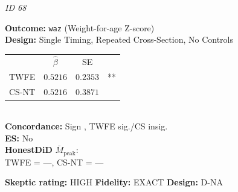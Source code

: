 \begin{tcolorbox}[
  colback=white, colframe=black!60, boxrule=0.4pt,
  arc=2pt, left=4pt, right=4pt, top=3pt, bottom=3pt]
  \footnotesize
  \textbf{\textcite{tanaka2014abolishing}} \hfill \textit{ID 68}\\[2pt]
  
  \begin{minipage}[t]{0.45\textwidth}
    \textbf{Outcome:} \texttt{waz} (Weight-for-age Z-score)\\
    \textbf{Design:} Single Timing, Repeated Cross-Section, No Controls\\
  \end{minipage}\hfill
  \begin{minipage}[t]{0.45\textwidth}
    \begin{tabular}{@{}lccc@{}}
      & $\hat{\beta}$ & SE & \\
      TWFE & $0.5216$ & $0.2353$ & ** \\
      CS-NT & $0.5216$ & $0.3871$ &  \\
    \end{tabular}\\[3pt]
    \textbf{Concordance:} Sign \checkmark, TWFE sig./CS insig.\\
    \textbf{ES:} No\\
    \textbf{HonestDiD} $\bar{M}_{\text{peak}}$:\\
    TWFE = ---, CS-NT = ---
  \end{minipage}
  \tcbline
  \textbf{Skeptic rating:} HIGH \hfill \textbf{Fidelity:} EXACT \hfill \textbf{Design:} D-NA
\end{tcolorbox}
\vspace{6pt}

